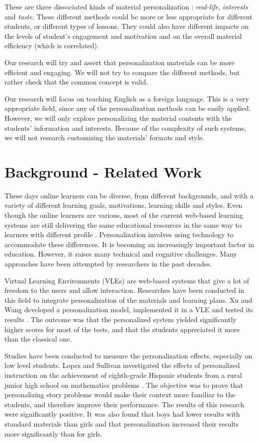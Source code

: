 \documentclass[a4paper,12pt]{article}
\begin{document}
These are three dissociated kinds of material personalization : \textit{real-life}, \textit{interests} and \textit{taste}. These different methods could be more or less appropriate for different students, or different types of lessons. They could also have different impacts on the levels of student’s engagement and motivation and on the overall material efficiency (which is correlated).

Our research will try and assert that personalization materials can be more efficient and engaging. We will not try to compare the different methods, but rather check that the common concept is valid.

Our research will focus on teaching English as a foreign language. This is a very appropriate field, since any of the personalization methods can be easily applied. However, we will only explore personalizing the material contents with the students' information and interests. Because of the complexity of such systems, we will not research customizing the materials' formats and style.


\section{Background - Related Work}

These days online learners can be diverse, from different backgrounds, and with a variety of different learning goals, motivations, learning skills and styles. Even though the online learners are various, most of the current web-based learning systems are still delivering the same educational resources in the same way to learners with different profile \cite{khribi_recommendations}. Personalization involves using technology to accommodate these differences. It is becoming an increasingly important factor in education. However, it raises many technical and cognitive challenges. Many approaches have been attempted by researchers in the past decades.

Virtual Learning Environments (VLEs) are web-based systems that give a lot of freedom to the users and allow interaction. Researches have been conducted in this field to integrate personalization of the materials and learning plans. Xu and Wang developed a personalization model, implemented it in a VLE and tested its results \cite{xu_vle}. The outcome was that the personalized system yielded significantly higher scores for most of the tests, and that the students appreciated it more than the classical one.

Studies have been conducted to measure the personalization effects, especially on low level students. Lopez and Sullivan investigated the effects of personalized instruction on the achievement of eighth-grade Hispanic students from a rural junior high school on mathematics problems \cite{lopez_hispanic}. The objective was to prove that personalizing story problems would make their context more familiar to the students, and therefore improve their performance. The results of this research were significantly positive. It was also found that boys had lower results with standard materials than girls and that personalization increased their results more significantly than for girls.
\end{document}
